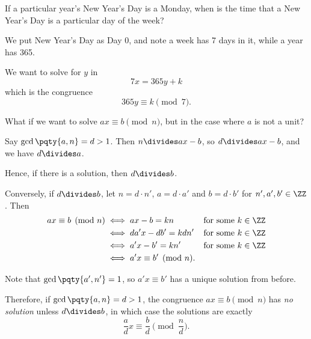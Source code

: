 \begin{example}
    If a particular year's New Year's Day is a Monday, when is the time that a New Year's Day is a particular day of the week?

    We put New Year's Day as Day 0, and note a week has 7 days in it, while a year has 365.

    We want to solve for \(y\) in
    \[
        7x = 365y + k
    \]
    which is the congruence
    \[
        365y \equiv k \pmod{7}.
    \]
\end{example}

What if we want to solve \(ax \equiv b \pmod{n}\), but in the case where \(a\) is not a unit?

Say \(\gcd\pqty{a, n} = d > 1\). Then \(n \divides ax - b\), so \(d \divides ax - b\), and we have \(d \divides a\).

Hence, if there is a solution, then \(d \divides b\).

Conversely, if \(d \divides b\), let \(n = d \cdot n'\), \(a = d \cdot a'\) and \(b = d \cdot b'\) for \(n', a', b' \in \ZZ\). Then
\begin{align*}
    ax \equiv b \pmod{n} &\iff ax - b = kn && \text{for some } k \in \ZZ \\
    &\iff d a' x - d b' = k d n' && \text{for some } k \in \ZZ \\
    &\iff a' x - b' = k n' && \text{for some } k \in \ZZ \\
    &\iff a' x \equiv b' \pmod{n}.
\end{align*}

Note that \(\gcd\pqty{a', n'} = 1\), so \(a' x \equiv b'\) has a unique solution from before.

Therefore, if \(\gcd\pqty{a, n} = d > 1\), the congruence \(ax \equiv b \pmod{n}\) has \emph{no solution} unless \(d \divides b\), in which case the solutions are exactly
\[
    \frac{a}{d} x \equiv \frac{b}{d} \pmod{\frac{n}{d}}.
\]

